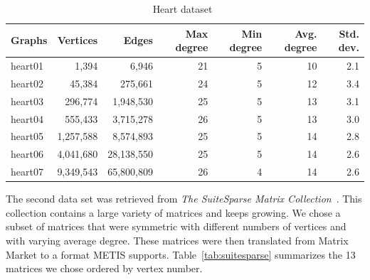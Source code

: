 \begin{table}[h]
	\centering
	\small
	\setlength{\tabcolsep}{3pt}
	\begin{tabular}{|l|r|r|r|r|r|r|}
		\hline
		\textbf{Graphs} & \textbf{Vertices} & \textbf{Edges} & \textbf{Max degree} & \textbf{Min degree} & \textbf{Avg. degree} & \textbf{Std. dev.}\\
		\hline
		heart01 & 1,394 & 6,946 & 21 & 5 & 10 & 2.1\\
		\hline
		heart02 & 45,384 & 275,661 & 24 & 5 & 12 & 3.4\\
		\hline
		heart03 & 296,774 & 1,948,530 & 25 & 5 & 13 & 3.1\\
		\hline
		heart04 & 555,433 & 3,715,278 & 26 & 5 & 13 & 3.0\\
		\hline
		heart05 & 1,257,588 &  8,574,893 & 25 & 5 & 14 & 2.8\\
		\hline
		heart06 & 4,041,680 &  28,138,550 & 25 & 5 & 14 & 2.6\\
		\hline
		heart07 & 9,349,543 & 65,800,809 & 26 & 4 & 14 & 2.6\\
		\hline
	\end{tabular}
	\caption{Heart dataset~\cite{martinez-navarro2019a}}
	\label{tab:heart_dataset}
\end{table}

The second data set was retrieved from \textit{The SuiteSparse Matrix Collection}~\cite{suitesparse}. This collection contains a large variety of matrices and keeps growing. We chose a subset of matrices that were symmetric with different numbers of vertices and with varying average degree. These matrices were then translated from Matrix Market to a format METIS supports. Table~\ref{tab:suitesparse} summarizes the 13 matrices we chose ordered by vertex number.

